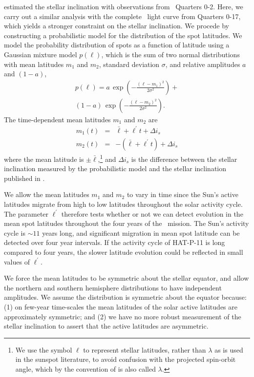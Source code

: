\citet{Sanchis-Ojeda2011} estimated the stellar inclination with observations from \kepler\ Quarters 0-2. Here, we carry out a similar analysis with the complete \kepler\ light curve from Quarters 0-17, which yields a stronger constraint on the stellar inclination. We procede by constructing a probabilistic model for the distribution of the spot latitudes. We model the probability distribution of spots as a function of latitude using a Gaussian mixture model $p(\ell)$, which is the sum of two normal distributions with mean latitudes $m_1$ and $m_2$, standard deviation $\sigma$, and relative amplitudes $a$ and $(1 - a)$,
\begin{multline}
p(\ell) = a \, \exp(-\frac{(\ell - m_1)^2}{2\sigma^2}) +\\ (1-a) \, \exp(-\frac{(\ell - m_2)^2}{2\sigma^2}).
\end{multline}
The time-dependent mean latitudes $m_1$ and $m_2$ are
\begin{eqnarray}
m_1(t) &=& \bar{\ell} + \ell^\prime t + \Delta i_s \\ 
m_2(t) &=& -(\bar{\ell} + \ell^\prime t) + \Delta i_s 
\end{eqnarray}
where the mean latitude is $\pm \bar{\ell}$,\footnote{We use the symbol $\ell$ to represent stellar latitudes, rather than $\lambda$ as is used in the sunspot literature, to avoid confusion with the projected spin-orbit angle, which by the convention of \citet{Ohta2005} is also called $\lambda$.} and $\Delta i_s$ is the difference between the stellar inclination measured by the probabilistic model and the stellar inclination published in \citet{Sanchis-Ojeda2011}. 

We allow the mean latitudes $m_1$ and $m_2$ to vary in time since the Sun's active latitudes migrate from high to low latitudes throughout the solar activity cycle. The parameter $\ell^\prime$ therefore tests whether or not we can detect evolution in the mean spot latitudes throughout the four years of the \kepler\ mission. The Sun's activity cycle is $\sim 11$ years long, and significant migration in mean spot latitude can be detected over four year intervals. If the activity cycle of HAT-P-11 is long compared to four years, the slower latitude evolution could be reflected in small values of $\ell^\prime$.

We force the mean latitudes to be symmetric about the stellar equator, and allow the northern and southern hemisphere distributions to have independent amplitudes. We assume the distribution is symmetric about the equator because: (1) on few-year time-scales the mean latitudes of the solar active latitudes are approximately symmetric; and (2) we have no more robust measurement of the stellar inclination to assert that the active latitudes are asymmetric. 

